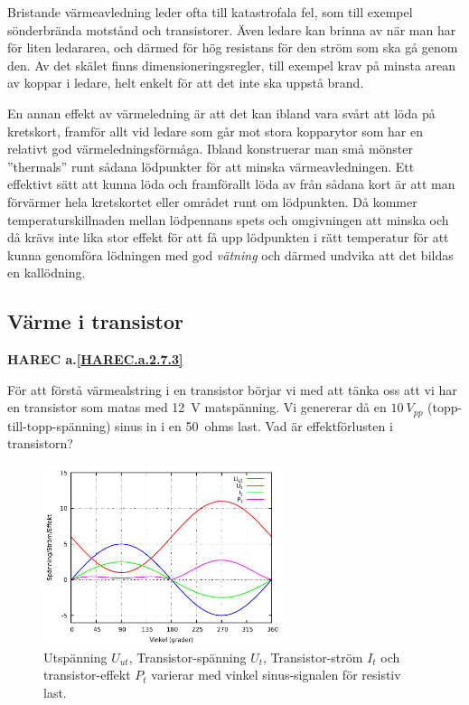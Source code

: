 Bristande värmeavledning leder ofta till katastrofala fel, som till exempel
sönderbrända motstånd och transistorer. Även ledare kan brinna av när man
har för liten ledararea, och därmed för hög resistans för den ström som
ska gå genom den. Av det skälet finns dimensioneringsregler, till exempel
krav på minsta arean av koppar i ledare, helt enkelt för att det inte ska
uppstå brand.

En annan effekt av värmeledning är att det kan ibland vara svårt att löda
på kretskort, framför allt vid ledare som går mot stora kopparytor som
har en relativt god värmeledningsförmåga. Ibland konstruerar man små mönster
''thermals'' runt sådana lödpunkter för att minska värmeavledningen.
Ett effektivt sätt att kunna löda och framförallt löda av från sådana
kort är att man förvärmer hela kretskortet eller området runt om
lödpunkten. Då kommer temperaturskillnaden mellan lödpennans spets och
omgivningen att minska och då krävs inte lika stor effekt för att få
upp lödpunkten i rätt temperatur för att kunna genomföra lödningen med god
\emph{vätning} och därmed undvika att det bildas en kallödning.

\subsection{Värme i transistor}
\textbf{
HAREC a.\ref{HAREC.a.2.7.3}\label{myHAREC.a.2.7.3}
}

För att förstå värmealstring i en transistor börjar vi med att tänka oss
att vi har en transistor som matas med 12~V matspänning. Vi genererar då en
\(10\ V_{pp}\) (topp-till-topp-spänning) sinus in i en 50~ohms last.
Vad är effektförlusten i transistorn?

\begin{figure}[ht]
\begin{center}
\includegraphics[width=7cm]{images/power1.pdf}
\caption{Utspänning $U_{ut}$, Transistor-spänning $U_t$, Transistor-ström $I_t$ och transistor-effekt $P_t$ varierar med vinkel sinus-signalen för resistiv last.}
\label{fig:power1}
\end{center}
\end{figure}

